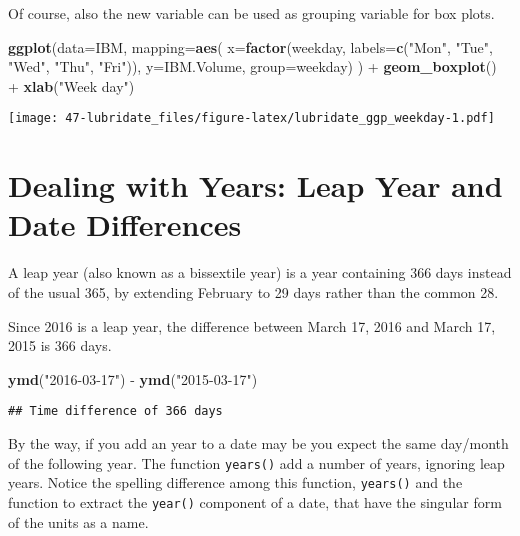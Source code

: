 \documentclass[]{book}
\newenvironment{Shaded}{\begin{snugshade}}{\end{snugshade}}
\newcommand{\KeywordTok}[1]{\textcolor[rgb]{0.13,0.29,0.53}{\textbf{{#1}}}}
\newcommand{\DataTypeTok}[1]{\textcolor[rgb]{0.13,0.29,0.53}{{#1}}}
\newcommand{\StringTok}[1]{\textcolor[rgb]{0.31,0.60,0.02}{{#1}}}
\newcommand{\NormalTok}[1]{{#1}}
\begin{document}
Of course, also the new variable can be used as grouping variable for
box plots.

\begin{Shaded}
\begin{Highlighting}[]
\KeywordTok{ggplot}\NormalTok{(}\DataTypeTok{data=}\NormalTok{IBM, }\DataTypeTok{mapping=}\KeywordTok{aes}\NormalTok{(}
    \DataTypeTok{x=}\KeywordTok{factor}\NormalTok{(weekday, }\DataTypeTok{labels=}\KeywordTok{c}\NormalTok{(}\StringTok{"Mon"}\NormalTok{, }\StringTok{"Tue"}\NormalTok{, }\StringTok{"Wed"}\NormalTok{, }\StringTok{"Thu"}\NormalTok{, }\StringTok{"Fri"}\NormalTok{)), }\DataTypeTok{y=}\NormalTok{IBM.Volume, }
    \DataTypeTok{group=}\NormalTok{weekday)}
  \NormalTok{) +}\StringTok{ }\KeywordTok{geom_boxplot}\NormalTok{() +}\StringTok{ }\KeywordTok{xlab}\NormalTok{(}\StringTok{"Week day"}\NormalTok{)}
\end{Highlighting}
\end{Shaded}

\texttt{[image: 47-lubridate\_files/figure-latex/lubridate\_ggp\_weekday-1.pdf]}

\section{Dealing with Years: Leap Year and Date
Differences}\label{dealing-with-years-leap-year-and-date-differences}

A leap year (also known as a bissextile year) is a year containing 366
days instead of the usual 365, by extending February to 29 days rather
than the common 28.

Since 2016 is a leap year, the difference between March 17, 2016 and
March 17, 2015 is 366 days.

\begin{Shaded}
\begin{Highlighting}[]
\KeywordTok{ymd}\NormalTok{(}\StringTok{"2016-03-17"}\NormalTok{) -}\StringTok{ }\KeywordTok{ymd}\NormalTok{(}\StringTok{"2015-03-17"}\NormalTok{)}
\end{Highlighting}
\end{Shaded}

\begin{verbatim}
## Time difference of 366 days
\end{verbatim}

By the way, if you add an year to a date may be you expect the same
day/month of the following year. The function \texttt{years()} add a
number of years, ignoring leap years. Notice the spelling difference
among this function, \texttt{years()} and the function to extract the
\texttt{year()} component of a date, that have the singular form of the
units as a name.
\end{document}
